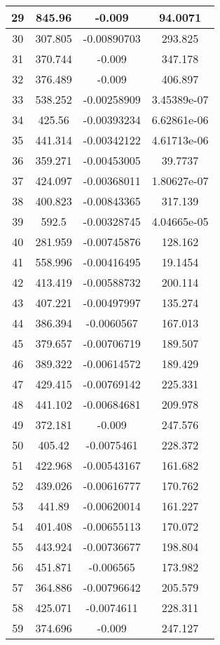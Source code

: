 \begin{table}[h]
{\begin{tabular}{|c|c|c|c|}
29	&	845.96	&	-0.009	&	94.0071	\\	\hline
30	&	307.805	&	-0.00890703	&	293.825	\\	\hline
31	&	370.744	&	-0.009	&	347.178	\\	\hline
32	&	376.489	&	-0.009	&	406.897	\\	\hline
33	&	538.252	&	-0.00258909	&	3.45389e-07	\\	\hline
34	&	425.56	&	-0.00393234	&	6.62861e-06	\\	\hline
35	&	441.314	&	-0.00342122	&	4.61713e-06	\\	\hline
36	&	359.271	&	-0.00453005	&	39.7737	\\	\hline
37	&	424.097	&	-0.00368011	&	1.80627e-07	\\	\hline
38	&	400.823	&	-0.00843365	&	317.139	\\	\hline
39	&	592.5	&	-0.00328745	&	4.04665e-05	\\	\hline
40	&	281.959	&	-0.00745876	&	128.162	\\	\hline
41	&	558.996	&	-0.00416495	&	19.1454	\\	\hline
42	&	413.419	&	-0.00588732	&	200.114	\\	\hline
43	&	407.221	&	-0.00497997	&	135.274	\\	\hline
44	&	386.394	&	-0.0060567	&	167.013	\\	\hline
45	&	379.657	&	-0.00706719	&	189.507	\\	\hline
46	&	389.322	&	-0.00614572	&	189.429	\\	\hline
47	&	429.415	&	-0.00769142	&	225.331	\\	\hline
48	&	441.102	&	-0.00684681	&	209.978	\\	\hline
49	&	372.181	&	-0.009	&	247.576	\\	\hline
50	&	405.42	&	-0.0075461	&	228.372	\\	\hline
51	&	422.968	&	-0.00543167	&	161.682	\\	\hline
52	&	439.026	&	-0.00616777	&	170.762	\\	\hline
53	&	441.89	&	-0.00620014	&	161.227	\\	\hline
54	&	401.408	&	-0.00655113	&	170.072	\\	\hline
55	&	443.924	&	-0.00736677	&	198.804	\\	\hline
56	&	451.871	&	-0.006565	&	173.982	\\	\hline
57	&	364.886	&	-0.00796642	&	205.579	\\	\hline
58	&	425.071	&	-0.0074611	&	228.311	\\	\hline
59	&	374.696	&	-0.009	&	247.127	\\	\hline

\end{tabular}}
\end{table}
